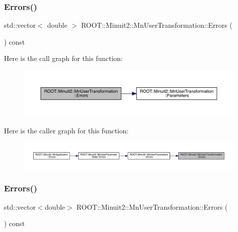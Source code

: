 \subsubsection{\texorpdfstring{Errors()}{Errors()}\hspace{0.1cm}{\footnotesize\ttfamily [1/2]}}
{\footnotesize\ttfamily std\+::vector$<$ double $>$ R\+O\+O\+T\+::\+Minuit2\+::\+Mn\+User\+Transformation\+::\+Errors (\begin{DoxyParamCaption}{ }\end{DoxyParamCaption}) const}

Here is the call graph for this function\+:\nopagebreak
\begin{figure}[H]
\begin{center}
\leavevmode
\includegraphics[width=350pt]{d9/d98/classROOT_1_1Minuit2_1_1MnUserTransformation_a7920b97096b486b27a4a020894677500_cgraph}
\end{center}
\end{figure}
Here is the caller graph for this function\+:\nopagebreak
\begin{figure}[H]
\begin{center}
\leavevmode
\includegraphics[width=350pt]{d9/d98/classROOT_1_1Minuit2_1_1MnUserTransformation_a7920b97096b486b27a4a020894677500_icgraph}
\end{center}
\end{figure}
\mbox{\label{classROOT_1_1Minuit2_1_1MnUserTransformation_af2da240e2a8273a63493847ab518288c}} 
\subsubsection{\texorpdfstring{Errors()}{Errors()}\hspace{0.1cm}{\footnotesize\ttfamily [2/2]}}
{\footnotesize\ttfamily std\+::vector$<$double$>$ R\+O\+O\+T\+::\+Minuit2\+::\+Mn\+User\+Transformation\+::\+Errors (\begin{DoxyParamCaption}{ }\end{DoxyParamCaption}) const}

